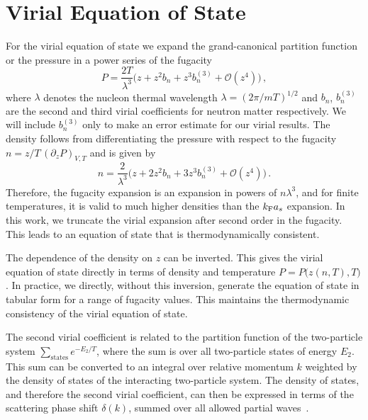 \documentclass[aps,prc,twocolumn,showpacs,showkeys,amsmath,amssymb]{revtex4}
\newcommand{\kf}{k_{\rm F}}
\newcommand{\as}{a_s}
\newcommand{\be}{\begin{equation}}
\newcommand{\ee}{\end{equation}}
\begin{document}
\section{Virial Equation of State}
\label{veos}

For the virial equation of state we expand the grand-canonical partition
function or the pressure in a power series of the fugacity
\be
P=\frac{2T}{\lambda^3}\bigl( z + z^2 b_n + z^3 b_n^{(3)} + \mathcal{O}(z^4) 
\bigr) \,,
\label{p}
\ee
where $\lambda$ denotes the nucleon thermal wavelength $\lambda = 
(2\pi/mT)^{1/2}$ and $b_n$, $b_n^{(3)}$ are the second and third 
virial coefficients for neutron matter respectively. We will include
$b_n^{(3)}$ only to make an error estimate for our virial results.
The density follows from differentiating the pressure with respect to 
the fugacity $n = z/T \, (\partial_z P)_{V,T}$ and is given by
\be
n = \frac{2}{\lambda^3}\bigl( z + 2 z^2 b_n + 3 z^3 b_n^{(3)} + 
\mathcal{O}(z^4) \bigr) \,.
\label{n}
\ee
Therefore, the fugacity expansion is an expansion in powers
of $n \lambda^3$, and for finite temperatures, it is valid to much higher
densities than the $\kf \as$ expansion.
In this work, we 
truncate the virial expansion after second order in the fugacity. This
leads to an equation of state that is thermodynamically consistent.

The dependence of the density on $z$ can be inverted. This gives the 
virial equation of state directly in terms of density and temperature
$P = P\bigl(z(n,T),T\bigr)$. In practice, we directly, without this
inversion, generate the equation of state in tabular form for a range 
of fugacity values. This maintains the thermodynamic consistency of the 
virial equation of state.

The second virial coefficient is related to the partition function of 
the two-particle system $\sum_{\text{states}} e^{-E_{2}/T}$, where the 
sum is over all two-particle states of energy $E_{2}$.  This sum can be 
converted to an integral over relative momentum $k$ weighted by the 
density of states of the interacting two-particle system. The density
of states, and therefore the second virial coefficient, can then be 
expressed in terms of the scattering phase shift $\delta(k)$, summed over 
all allowed partial waves~\cite{b2,huang}.
\end{document}
